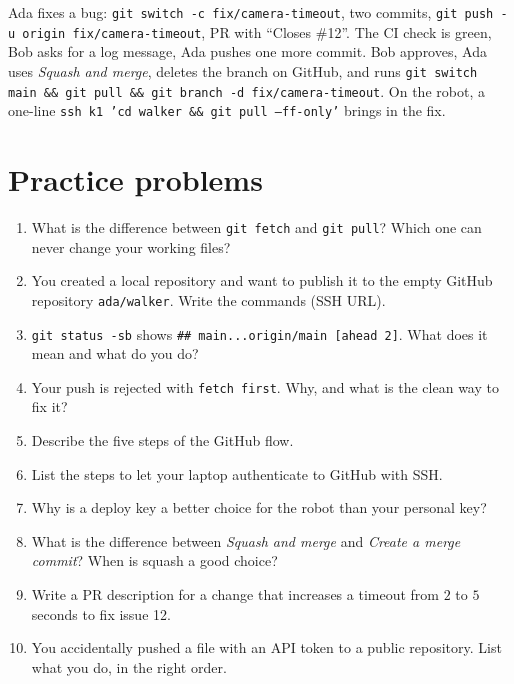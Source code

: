 \begin{example}
Ada fixes a bug: \texttt{git switch -c fix/camera-timeout}, two commits, \texttt{git push -u origin fix/camera-timeout}, PR with ``Closes \#12''. The CI check is green, Bob asks for a log message, Ada pushes one more commit. Bob approves, Ada uses \emph{Squash and merge}, deletes the branch on GitHub, and runs \texttt{git switch main \&\& git pull \&\& git branch -d fix/camera-timeout}. On the robot, a one-line \texttt{ssh k1 'cd walker \&\& git pull --ff-only'} brings in the fix.
\end{example}

\section*{Practice problems}
\begin{enumerate}[label=\textbf{\thechapter.\arabic*}]
  \item What is the difference between \texttt{git fetch} and \texttt{git pull}? Which one can never change your working files?
  \item You created a local repository and want to publish it to the empty GitHub repository \texttt{ada/walker}. Write the commands (SSH URL).
  \item \texttt{git status -sb} shows \verb!## main...origin/main [ahead 2]!. What does it mean and what do you do?
  \item Your push is rejected with \texttt{fetch first}. Why, and what is the clean way to fix it?
  \item Describe the five steps of the GitHub flow.
  \item List the steps to let your laptop authenticate to GitHub with SSH.
  \item Why is a deploy key a better choice for the robot than your personal key?
  \item What is the difference between \emph{Squash and merge} and \emph{Create a merge commit}? When is squash a good choice?
  \item Write a PR description for a change that increases a timeout from $2$ to $5$ seconds to fix issue 12.
  \item[\textbf{\thechapter.10}$\star$] You accidentally pushed a file with an API token to a public repository. List what you do, in the right order.
\end{enumerate}
